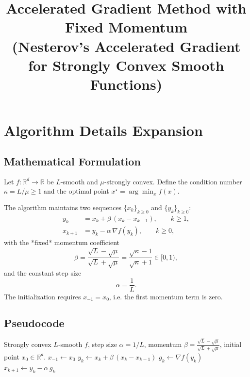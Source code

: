 \documentclass[11pt]{article}
\begin{document}
\title{Accelerated Gradient Method with Fixed Momentum \\ (Nesterov’s Accelerated Gradient for Strongly Convex Smooth Functions)}
\author{}
\date{}
\maketitle

\section*{Algorithm Details Expansion}

\subsection*{Mathematical Formulation}
Let $f:\mathbb{R}^d\rightarrow\mathbb{R}$ be $L$‑smooth and $\mu$‑strongly convex.  
Define the condition number $\kappa = L/\mu\ge 1$ and the optimal point $x^\star = \arg\min_x f(x)$.  

The algorithm maintains two sequences $\{x_k\}_{k\ge 0}$ and $\{y_k\}_{k\ge 0}$:
\begin{align}
    y_k &= x_k + \beta\,(x_k - x_{k-1}), \qquad k\ge 1,\label{eq:momentum}\\
    x_{k+1} &= y_k - \alpha\,\nabla f(y_k), \qquad k\ge 0,\label{eq:update}
\end{align}
with the *fixed* momentum coefficient
\[
    \beta = \frac{\sqrt{L}-\sqrt{\mu}}{\sqrt{L}+\sqrt{\mu}} = \frac{\sqrt{\kappa}-1}{\sqrt{\kappa}+1}\in[0,1),
\]
and the constant step size
\[
    \alpha = \frac{1}{L}.
\]
The initialization requires $x_{-1}=x_0$, i.e. the first momentum term is zero.

\subsection*{Pseudocode}
\begin{algorithm}[H]
\caption{Accelerated Gradient Method (AGM) with Fixed Momentum}
\begin{algorithmic}[1]
\Require Strongly convex $L$‑smooth $f$, step size $\alpha=1/L$, momentum $\beta=\frac{\sqrt{L}-\sqrt{\mu}}{\sqrt{L}+\sqrt{\mu}}$, initial point $x_0\in\mathbb{R}^d$.
\State $x_{-1}\gets x_0$ 
    \State $y_k \gets x_k + \beta\,(x_k - x_{k-1})$ \label{alg:momentum}
    \State $g_k \gets \nabla f(y_k)$
    \State $x_{k+1} \gets y_k - \alpha\, g_k$ \label{alg:update}
\EndFor
\end{algorithmic}
\end{algorithm}
\end{document}

